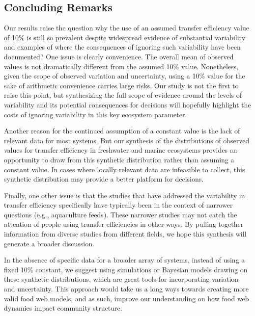 \documentclass[oneside,12pt,final]{sty/ucthesis-CA2012}
\begin{document}
\begin{mainmatter}
\section{Concluding Remarks}
Our results raise the question why the use of an assumed transfer efficiency value of 10\% is still so prevalent despite widespread evidence of substantial variability and examples of where the consequences of ignoring such variability have been documented? One issue is clearly convenience. The overall mean of observed values is not dramatically different from the assumed 10\% value. Nonetheless, given the scope of observed variation and uncertainty, using a 10\% value for the sake of arithmetic convenience carries large risks. Our study is not the first to raise this point, but synthesizing the full scope of evidence around the levels of variability and its potential consequences for decisions will hopefully highlight the costs of ignoring variability in this key ecosystem parameter. 

\vspace{5mm}

Another reason for the continued assumption of a constant value is the lack of relevant data for most systems. But our synthesis of the distributions of observed values for transfer efficiency in freshwater and marine ecosystems provides an opportunity to draw from this synthetic distribution rather than assuming a constant value. In cases where locally relevant data are infeasible to collect, this synthetic distribution may provide a better platform for decisions. 

\vspace{5mm}

Finally, one other issue is that the studies that have addressed the variability in transfer efficiency specifically have typically been in the context of narrower questions (e.g., aquaculture feeds). These narrower studies may not catch the attention of people using transfer efficiencies in other ways. By pulling together information from diverse studies from different fields, we hope this synthesis will generate a broader discussion.

\vspace{5mm}

In the absence of specific data for a broader array of systems, instead of using a fixed 10\% constant, we suggest using simulations or Bayesian models drawing on these synthetic distributions, which are great tools for incorporating variation and uncertainty. This approach would take us a long ways towards creating more valid food web models, and as such, improve our understanding on how food web dynamics impact community structure. 



\end{mainmatter}
\end{document}
